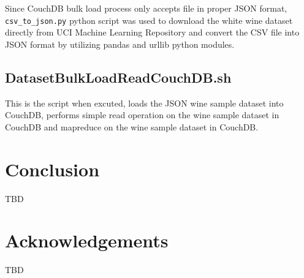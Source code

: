 Since CouchDB bulk load process only accepts file in proper JSON
format, \verb|csv_to_json.py| python script was used to
download the white wine dataset directly from UCI Machine Learning
Repository and convert the CSV file into JSON format by utilizing
pandas and urllib python modules.

\subsection{DatasetBulkLoadReadCouchDB.sh}
This is the script when excuted, loads the JSON wine sample dataset
into CouchDB, performs simple read operation on the wine sample
dataset in CouchDB and mapreduce on the wine sample
dataset in CouchDB.



\section{Conclusion}
TBD
\section*{Acknowledgements}

TBD


 





